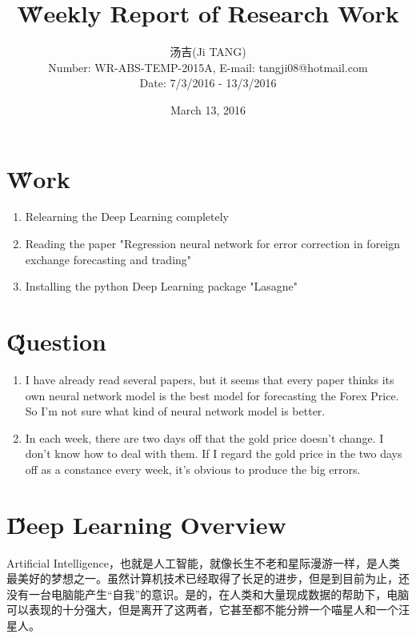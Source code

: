 \documentclass[12pt]{article}
\title{{\H Weekly Report of Research Work\\ }\quad {WR-ABS-TEMP-2015A-No.016}}
\author{汤吉(Ji TANG)\\
               Number: WR-ABS-TEMP-2015A,  E-mail: tangji08@hotmail.com \\
        Date: 7/3/2016 - 13/3/2016}
\date{March 13, 2016}
\begin{document}
  
\maketitle
\pagestyle{fancy}
\fancyhead[LO,RE]{\leftmark} %



\renewcommand{\headrulewidth}{0.4pt}
\renewcommand{\footrulewidth}{0.4pt}



\tableofcontents 
\newpage
\section{\H Work}
\begin{enumerate}
	\item Relearning the Deep Learning completely
	\item Reading the paper "Regression neural network for error correction in foreign exchange forecasting and trading"
	\item Installing the python Deep Learning package "Lasagne"
\end{enumerate}

\section{\H Question}
\begin{enumerate}
	\item I have already read several papers, but it seems that every paper thinks its own neural network model is the best model for forecasting the Forex Price. So I'm not sure what kind of neural network model is better.
	\item In each week, there are two days off that the gold price doesn't change. I don't know how to deal with them. If I regard the gold price in the two days off as a constance every week, it's obvious to produce the big errors.
\end{enumerate}

\section{\H Deep Learning Overview}
Artificial Intelligence，也就是人工智能，就像长生不老和星际漫游一样，是人类最美好的梦想之一。虽然计算机技术已经取得了长足的进步，但是到目前为止，还没有一台电脑能产生“自我”的意识。是的，在人类和大量现成数据的帮助下，电脑可以表现的十分强大，但是离开了这两者，它甚至都不能分辨一个喵星人和一个汪星人。
\end{document}
